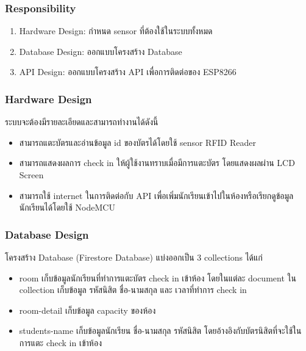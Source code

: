 \documentclass[fontsize=14pt]{extarticle}
\begin{document}
\subsubsection{Responsibility}
\begin{enumerate}
    \item Hardware Design: กำหนด sensor ที่ต้องใช้ในระบบทั้งหมด
    \item Database Design: ออกแบบโครงสร้าง Database
    \item API Design: ออกแบบโครงสร้าง API เพื่อการติดต่อของ ESP8266
\end{enumerate}
\subsubsection{Hardware Design}
ระบบจะต้องมีรายละเอียดและสามารถทำงานได้ดังนี้
\begin{itemize}
    \item สามารถแตะบัตรและอ่านข้อมูล id ของบัตรได้โดยใช้ sensor RFID Reader
    \item สามารถแสดงผลการ check in ให้ผู้ใช้งานทราบเมื่อมีการแตะบัตร โดยแสดงผลผ่าน LCD Screen
    \item สามารถใช้ internet ในการติดต่อกับ API เพื่อเพิ่มนักเรียนเข้าไปในห้องหรือเรียกดูข้อมูลนักเรียนได้โดยใช้ NodeMCU
\end{itemize}
\subsubsection{Database Design}
โครงสร้าง Database (Firestore Database) แบ่งออกเป็น 3 collections ได้แก่
  \begin{itemize}
      \item room
            เก็บข้อมูลนักเรียนที่ทำการแตะบัตร check in เข้าห้อง โดยในแต่ละ document ใน collection เก็บข้อมูล รหัสนิสิต ชื่อ-นามสกุล และ เวลาที่ทำการ check in
      \item room-detail
            เก็บข้อมูล capacity ของห้อง
      \item students-name
            เก็บข้อมูลนักเรียน ชื่อ-นามสกุล รหัสนิสิต โดยอ้างอิงกับบัตรนิสิตที่จะใช้ในการแตะ check in เข้าห้อง
  \end{itemize}
\end{document}
